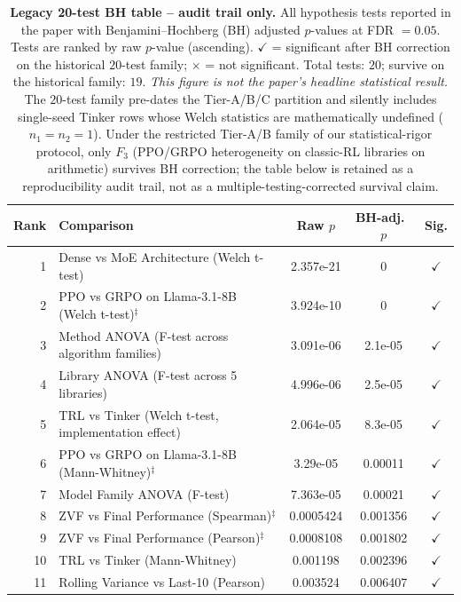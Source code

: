 \documentclass{article}
\begin{document}
\begin{table}[!ht]
\centering
\caption{\textbf{Legacy 20-test BH table -- audit trail only.} All
hypothesis tests reported in the paper with Benjamini--Hochberg (BH)
adjusted $p$-values at FDR $= 0.05$.  Tests are ranked by raw
$p$-value (ascending). $\checkmark$ = significant after BH correction
on the historical $20$-test family; $\times$ = not significant. Total
tests: $20$; survive on the historical family: $19$. \emph{This
figure is not the paper's headline statistical result.} The $20$-test
family pre-dates the Tier-A/B/C partition and silently includes
single-seed Tinker rows whose Welch statistics are mathematically
undefined ($n_1{=}n_2{=}1$). Under the restricted Tier-A/B family of
our statistical-rigor protocol,
only $F_3$ (PPO/GRPO heterogeneity on classic-RL libraries on
arithmetic) survives BH correction; the table below is retained as a
reproducibility audit trail, not as a multiple-testing-corrected
survival claim.}
\label{tab:bh-pvalues}
\scriptsize
\begin{tabular}{@{}rp{6.2cm}ccc@{}}
\toprule
Rank & Comparison & Raw $p$ & BH-adj.\ $p$ & Sig. \\
\midrule
        1 & Dense vs MoE Architecture (Welch t-test) & 2.357e-21 & 0 & $\checkmark$ \\
        2 & PPO vs GRPO on Llama-3.1-8B (Welch t-test)$^{\ddag}$ & 3.924e-10 & 0 & $\checkmark$ \\
        3 & Method ANOVA (F-test across algorithm families) & 3.091e-06 & 2.1e-05 & $\checkmark$ \\
        4 & Library ANOVA (F-test across 5 libraries) & 4.996e-06 & 2.5e-05 & $\checkmark$ \\
        5 & TRL vs Tinker (Welch t-test, implementation effect) & 2.064e-05 & 8.3e-05 & $\checkmark$ \\
        6 & PPO vs GRPO on Llama-3.1-8B (Mann-Whitney)$^{\ddag}$ & 3.29e-05 & 0.00011 & $\checkmark$ \\
        7 & Model Family ANOVA (F-test) & 7.363e-05 & 0.00021 & $\checkmark$ \\
        8 & ZVF vs Final Performance (Spearman)$^{\ddag}$ & 0.0005424 & 0.001356 & $\checkmark$ \\
        9 & ZVF vs Final Performance (Pearson)$^{\ddag}$ & 0.0008108 & 0.001802 & $\checkmark$ \\
        10 & TRL vs Tinker (Mann-Whitney) & 0.001198 & 0.002396 & $\checkmark$ \\
        11 & Rolling Variance vs Last-10 (Pearson) & 0.003524 & 0.006407 & $\checkmark$ \\

\end{tabular}
\end{table}
\end{document}
